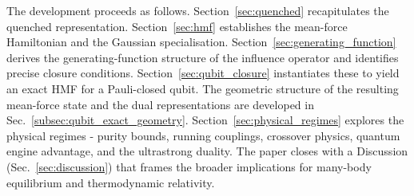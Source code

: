 The development proceeds as follows.
Section~\ref{sec:quenched} recapitulates the quenched representation.
Section~\ref{sec:hmf} establishes the mean-force Hamiltonian and the
Gaussian specialisation.
Section~\ref{sec:generating_function} derives the generating-function
structure of the influence operator and identifies precise closure conditions.
Section~\ref{sec:qubit_closure} instantiates these to yield an exact
HMF for a Pauli-closed qubit.
The geometric structure of the resulting mean-force state and the dual
representations are developed in
Sec.~\ref{subsec:qubit_exact_geometry}.
Section~\ref{sec:physical_regimes} explores the physical regimes -
purity bounds, running couplings, crossover physics, quantum engine
advantage, and the ultrastrong duality.
The paper closes with a Discussion
(Sec.~\ref{sec:discussion}) that frames the broader implications for
many-body equilibrium and thermodynamic relativity.
